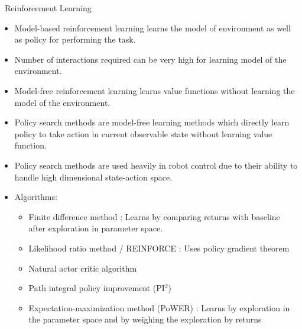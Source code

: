 \documentclass[aspectratio=169]{beamer}
\begin{document}
\begin{frame}[allowframebreaks]{~}{Reinforcement Learning}
	\vspace{-0.5cm}
	\begin{itemize}
		\item {Model-based} reinforcement learning learns the model of environment as well as policy for performing the task.
		\item Number of interactions required can be very high for learning model of the environment.
		\item {Model-free} reinforcement learning learns value functions without learning the model of the environment. 
		\item Policy search methods are model-free learning methods which directly learn policy to take action in current observable state without learning value function.
		\framebreak
		\item Policy search methods are used heavily in robot control due to their ability to handle high dimensional state-action space.
		\item Algorithms:
		\begin{itemize}
			
			\item Finite difference method : Learns by comparing returns with baseline after exploration in parameter space.
			\item Likelihood ratio method / REINFORCE : Uses policy gradient theorem  
			\item Natural actor critic algorithm 
			\item Path integral policy improvement (PI$^{2}$)
			\item Expectation-maximization method (PoWER) : Learns by exploration in the parameter space and by weighing the exploration by returns
		\end{itemize} 
		
	\end{itemize}
\end{frame}
\end{document}
